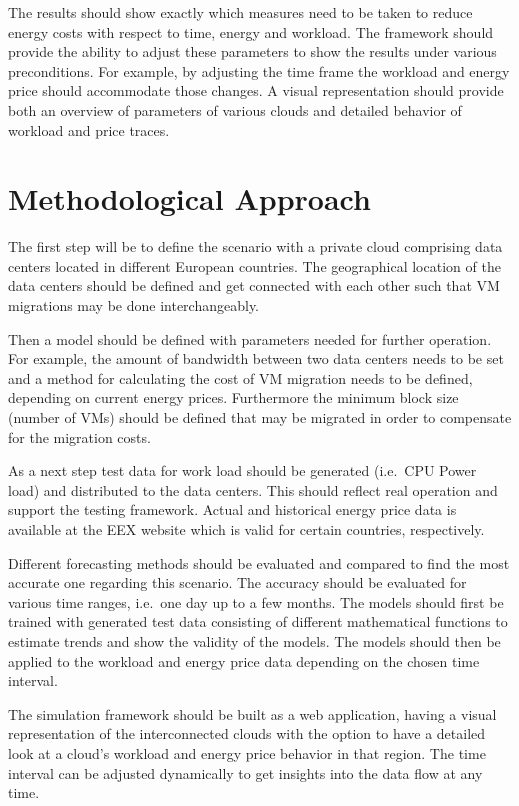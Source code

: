 \documentclass[a4paper]{article}
\begin{document}
The results should show exactly which measures need to be taken to reduce energy costs with respect to time, energy and workload. The framework should provide the ability to adjust these parameters to show the results under various preconditions. For example, by adjusting the time frame the workload and energy price should accommodate those changes. A visual representation should provide both an overview of parameters of various clouds and detailed behavior of workload and price traces. 


\section{Methodological Approach}

The first step will be to define the scenario with a private cloud comprising data centers located in different European countries. The geographical location of the data centers should be defined and get connected with each other such that VM migrations may be done interchangeably. 

Then a model should be defined with parameters needed for further operation. For example, the amount of bandwidth between two data centers needs to be set and a method for calculating the cost of VM migration needs to be defined, depending on current energy prices. Furthermore the minimum block size (number of VMs) should be defined that may be migrated in order to compensate for the migration costs.

As a next step test data for work load should be generated (i.e.\ CPU Power load) and distributed to the data centers. This should reflect real operation and support the testing framework. Actual and historical energy price data is available at the EEX website which is valid for certain countries, respectively. 

Different forecasting methods should be evaluated and compared to find the most accurate one regarding this scenario. The accuracy should be evaluated for various time ranges, i.e.\ one day up to a few months. The models should first be trained with generated test data consisting of different mathematical functions to estimate trends and show the validity of the models. The models should then be applied to the workload and energy price data depending on the chosen time interval. 

The simulation framework should be built as a web application, having a visual representation of the interconnected clouds with the option to have a detailed look at a cloud’s workload and energy price behavior in that region. The time interval can be adjusted dynamically to get insights into the data flow at any time.
\end{document}
